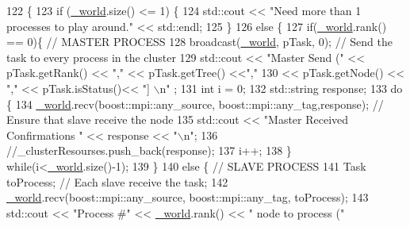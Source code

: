 \begin{DoxyCode}
122                                                       \{
123     \textcolor{keywordflow}{if} (\hyperlink{classrdf_1_1DistributionManager_ac8a061176717baf96b2913cd22dcbf20}{\_world}.size() <= 1) \{
124     std::cout << \textcolor{stringliteral}{"Need more than 1 processes to play around."} << std::endl;
125     \}
126     \textcolor{keywordflow}{else} \{ 
127         \textcolor{keywordflow}{if}(\hyperlink{classrdf_1_1DistributionManager_ac8a061176717baf96b2913cd22dcbf20}{\_world}.rank() == 0)\{                                           \textcolor{comment}{// MASTER PROCESS}
128             broadcast(\hyperlink{classrdf_1_1DistributionManager_ac8a061176717baf96b2913cd22dcbf20}{\_world}, pTask, 0);                                  \textcolor{comment}{// Send the task to every
       process in the cluster}
129             std::cout << \textcolor{stringliteral}{"Master Send ("} << pTask.getRank() << \textcolor{stringliteral}{","} << pTask.getTree() <<\textcolor{stringliteral}{","}
130                     << pTask.getNode() << \textcolor{stringliteral}{","} << pTask.isStatus()<< \textcolor{stringliteral}{"] \(\backslash\)n"} ;
131                         \textcolor{keywordtype}{int} i = 0;
132                         std::string response;
133                         \textcolor{keywordflow}{do} \{
134                             \hyperlink{classrdf_1_1DistributionManager_ac8a061176717baf96b2913cd22dcbf20}{\_world}.recv(boost::mpi::any\_source, boost::mpi::any\_tag,response); \textcolor{comment}{//
       Ensure that slave receive the node}
135                             std::cout << \textcolor{stringliteral}{"Master Received Confirmations "} << response  << \textcolor{stringliteral}{"\(\backslash\)n"};
136                             \textcolor{comment}{//\_clusterResourses.push\_back(response);}
137                             i++;
138                         \} \textcolor{keywordflow}{while}(i<\hyperlink{classrdf_1_1DistributionManager_ac8a061176717baf96b2913cd22dcbf20}{\_world}.size()-1); 
139         \}   
140         \textcolor{keywordflow}{else} \{                                                          \textcolor{comment}{// SLAVE PROCESS}
141             Task toProcess;                                             \textcolor{comment}{// Each slave receive the task;}
142             \hyperlink{classrdf_1_1DistributionManager_ac8a061176717baf96b2913cd22dcbf20}{\_world}.recv(boost::mpi::any\_source, boost::mpi::any\_tag, toProcess);
143             std::cout << \textcolor{stringliteral}{"Process #"} << \hyperlink{classrdf_1_1DistributionManager_ac8a061176717baf96b2913cd22dcbf20}{\_world}.rank() << \textcolor{stringliteral}{" node to process ("} 

\end{DoxyCode}
